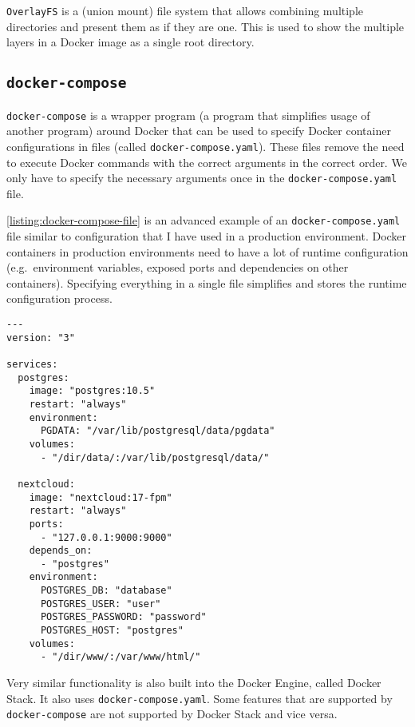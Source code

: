 \lstinline{OverlayFS} is a (union mount) file system that allows combining multiple directories and present them as if they are one. This is used to show the multiple layers in a Docker image as a single root directory.


\subsection{\texorpdfstring{\lstinline{docker-compose}}{docker-compose}}
\lstinline{docker-compose} is a wrapper program (a program that simplifies usage of another program) around Docker that can be used to specify Docker container configurations in files (called \lstinline{docker-compose.yaml}). These files remove the need to execute Docker commands with the correct arguments in the correct order. We only have to specify the necessary arguments once in the \lstinline{docker-compose.yaml} file.

\hfill

\autoref{listing:docker-compose-file} is an advanced example of an \lstinline{docker-compose.yaml} file similar to configuration that I have used in a production environment. Docker containers in production environments need to have a lot of runtime configuration (e.g.\ environment variables, exposed ports and dependencies on other containers). Specifying everything in a single file simplifies and stores the runtime configuration process.
\begin{lstlisting}[caption={Example \lstinline{docker-compose.yaml}.},label={listing:docker-compose-file},captionpos=b]
---
version: "3"

services:
  postgres:
    image: "postgres:10.5"
    restart: "always"
    environment:
      PGDATA: "/var/lib/postgresql/data/pgdata"
    volumes:
      - "/dir/data/:/var/lib/postgresql/data/"

  nextcloud:
    image: "nextcloud:17-fpm"
    restart: "always"
    ports:
      - "127.0.0.1:9000:9000"
    depends_on:
      - "postgres"
    environment:
      POSTGRES_DB: "database"
      POSTGRES_USER: "user"
      POSTGRES_PASSWORD: "password"
      POSTGRES_HOST: "postgres"
    volumes:
      - "/dir/www/:/var/www/html/"
\end{lstlisting}

Very similar functionality is also built into the Docker Engine, called Docker Stack. It also uses \lstinline{docker-compose.yaml}. Some features that are supported by \lstinline{docker-compose} are not supported by Docker Stack and vice versa.

